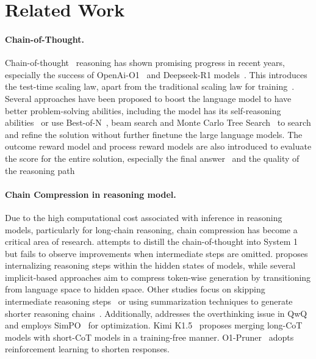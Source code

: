 \section{Related Work}
\paragraph{Chain-of-Thought.}
Chain-of-thought~\cite{wei2022chain} reasoning has shown promising progress in recent years, especially the success of OpenAi-O1~\citep{jaech2024openai} and Deepseek-R1 models~\citep{deepseekai2025deepseekr1incentivizingreasoningcapability}. This introduces the test-time scaling law, apart from the traditional scaling law for training~\cite{hoffmann2022trainingcomputeoptimallargelanguage}. Several approaches have been proposed to boost the language model to have better problem-solving abilities, including the model has its self-reasoning abilities~\citep{qwq-32b-preview} or use Best-of-N~\citep{Nakano2021WebGPTBQ}, beam search and Monte Carlo Tree Search~\citep{Kocsis2006BanditBM,guan2025rstar} to search and refine the solution without further finetune the large language models. The outcome reward model and process reward models are also introduced to evaluate the score for the entire solution, especially the final answer~\citep{Cobbe2021TrainingVT} and the 
quality of the reasoning path~\citep{wang-etal-2024-math,luo2025improve}

\paragraph{Chain Compression in reasoning model.} Due to the high computational cost associated with inference in reasoning models, particularly for long-chain reasoning, chain compression has become a critical area of research. \citep{Yu2024DistillingS2} attempts to distill the chain-of-thought into System 1 but fails to observe improvements when intermediate steps are omitted. \citep{deng2024implicit} proposes internalizing reasoning steps within the hidden states of models, while several implicit-based approaches\citep{deng2024explicitcotimplicitcot,hao2024traininglargelanguagemodels,cheng2024compressedchainthoughtefficient} aim to compress token-wise generation by transitioning from language space to hidden space. Other studies focus on skipping intermediate reasoning steps~\citep{liu2024can} or using summarization techniques to generate shorter reasoning chains~\citep{kang2024c3otgeneratingshorterchainofthought}.
Additionally, \cite{chen2024not} addresses the overthinking issue in QwQ~\citep{qwq-32b-preview} and employs SimPO~\citep{meng2024simpo} for optimization. Kimi K1.5~\citep{team2025kimi} proposes merging long-CoT models with short-CoT models in a training-free manner. O1-Pruner~\citep{luo2025o1} adopts reinforcement learning to shorten responses.  


